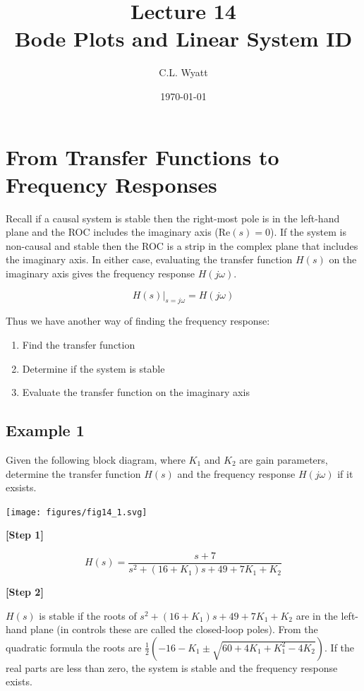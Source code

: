 \documentclass{article}
\begin{document}
\title{Lecture 14\\Bode Plots and Linear System ID}
\author{C.L. Wyatt}
\date{\today}
\maketitle

\section{From Transfer Functions to Frequency Responses}

Recall if a causal system is stable then the right-most pole is in the left-hand plane and the ROC includes the imaginary axis ($\text{Re}(s) = 0$). If the system is non-causal and stable then the ROC is a strip in the complex plane that includes the imaginary axis. In either case, evaluating the transfer function $H(s)$ on the imaginary axis gives the frequency response $H(j\omega)$.

$$
\left.H(s)\right|_{s=j \omega}=H(j \omega)
$$

Thus we have another way of finding the frequency response:

\begin{enumerate}
\item Find the transfer function
\item Determine if the system is stable
\item Evaluate the transfer function on the imaginary axis
\end{enumerate}

\subsection{Example 1}

Given the following block diagram, where $K_1$ and $K_2$ are gain parameters, determine the transfer function $H(s)$ and the frequency response $H(j\omega)$ if it exsists.

\texttt{[image: figures/fig14\_1.svg]}

\textbf{[Step 1]}

\[
H(s) = \frac{s+7}{s^2 + (16 + K_1)s + 49 + 7K_1 + K_2}
\]

\textbf{[Step 2]}

$H(s)$ is stable if the roots of $s^2 + (16 + K_1)s + 49 + 7K_1 + K_2$ are in the left-hand plane (in controls these are called the closed-loop poles). From the quadratic formula the roots are
$\frac{1}{2}\left(-16-K_1 \pm \sqrt{60+4K_1 + K_1^2 - 4K_2}\right)$. If the real parts are less than zero, the system is stable and the frequency response exists.
\end{document}
